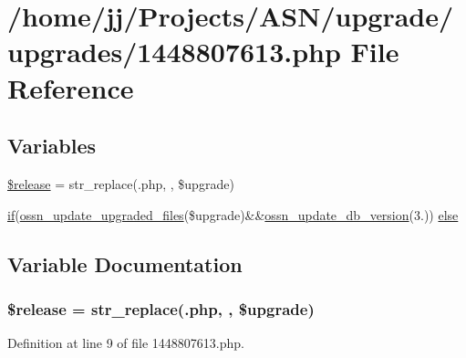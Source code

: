 \hypertarget{1448807613_8php}{}\section{/home/jj/\+Projects/\+A\+S\+N/upgrade/upgrades/1448807613.php File Reference}
\label{1448807613_8php}
\subsection*{Variables}
\begin{DoxyCompactItemize}
\item 
\hyperlink{1448807613_8php_a63c5d6a8a9f1768ea926cee666dc991b}{\$release} = str\+\_\+replace(\textquotesingle{}.php\textquotesingle{}, \textquotesingle{}\textquotesingle{}, \$upgrade)
\item 
\hyperlink{jquery_8tokeninput_8js_ad8dd46a3cbc004569e34401e9e71771a}{if}(\hyperlink{ossn_8lib_8upgrade_8php_af5e235e44fa65a589d768b2693399250}{ossn\+\_\+update\+\_\+upgraded\+\_\+files}(\$upgrade)\&\&\hyperlink{ossn_8lib_8upgrade_8php_aa7120e10a9c14b722b0e25c99bc86d92}{ossn\+\_\+update\+\_\+db\+\_\+version}(\textquotesingle{}3.\textquotesingle{})) \hyperlink{1448807613_8php_af6ac4c181fec94efbdd43ddf4d0566c6}{else}
\end{DoxyCompactItemize}


\subsection{Variable Documentation}
\subsubsection[{\texorpdfstring{\$release}{$release}}]{\setlength{\rightskip}{0pt plus 5cm}\$release = str\+\_\+replace(\textquotesingle{}.php\textquotesingle{}, \textquotesingle{}\textquotesingle{}, \$upgrade)}\hypertarget{1448807613_8php_a63c5d6a8a9f1768ea926cee666dc991b}{}\label{1448807613_8php_a63c5d6a8a9f1768ea926cee666dc991b}


Definition at line 9 of file 1448807613.\+php.

